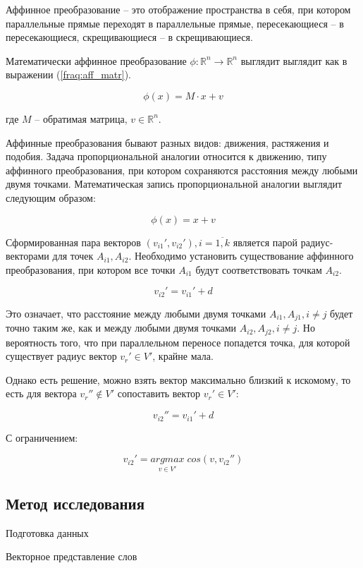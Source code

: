 \documentclass[a4paper,14pt]{article}
\begin{document}
Аффинное преобразование -- это отображение пространства в себя, при котором параллельные прямые переходят в параллельные прямые, пересекающиеся -- в пересекающиеся, скрещивающиеся -- в скрещивающиеся.

Математически аффинное преобразование $\phi : \mathbb{R}^n \rightarrow \mathbb{R}^n$ выглядит выглядит как в выражении (\ref{fraq:aff_matr}).

\begin{equation}
	\phi(x) = M \cdot x + v
	\label{fraq:aff_matr}
\end{equation}

где $M$ -- обратимая матрица, $v \in \mathbb{R}^n$.

Аффинные преобразования бывают разных видов: движения, растяжения и подобия.
Задача пропорциональной аналогии относится к движению, типу аффинного преобразования, при котором сохраняются расстояния между любыми двумя точками.
Математическая запись пропорциональной аналогии выглядит следующим образом:

$$\phi(x) =  x + v$$

Сформированная пара векторов $(v_{i1}', v_{i2}'), i = \overline{1,k}$ является парой радиус-векторами для точек $A_{i1}, A_{i2}$.
Необходимо установить существование аффинного преобразования, при котором все точки $A_{i1}$ будут соответствовать точкам $A_{i2}$.

$$v_{i2}' = v_{i1}' + d$$

Это означает, что расстояние между любыми двумя точками $A_{i1}, A_{j1}, i \neq j$ будет точно таким же, как и между любыми двумя точками $A_{i2}, A_{j2}, i \neq j$.
Но вероятность того, что при параллельном переносе попадется точка, для которой существует радиус вектор $v_r' \in V'$, крайне мала.

Однако есть решение, можно взять вектор максимально близкий к искомому, то есть для вектора $v_r'' \notin V'$ сопоставить вектор  $v_r' \in V'$:

$$v_{i2}'' = v_{i1}' + d$$

С ограничением:

$$v_{i2}' = \underset{v \in V'}{argmax} \; cos(v, v_{i2}'')$$

\subsection{Метод исследования}

	Подготовка данных
	
	Векторное представление слов
	
\end{document}
